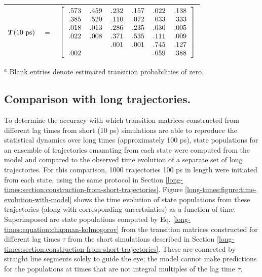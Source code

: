 \begin{table}[tbh]
\begin{center}
\begin{tabular}{lcc}
${\mbox{\boldmath{$T$}}}(10~\mathrm{ps})$ & $=$ & 
$\left[
\begin{tabular}{cccccc}
.573 & .459 & .232 & .157 & .022 & .138 \\
.385 & .520 & .110 & .072 & .033 & .333 \\
.018 & .013 & .286 & .235 & .030 & .005 \\
.022 & .008 & .371 & .535 & .111 & .009 \\
     &      & .001 & .001 & .745 & .127 \\
.002 &      &      &      & .059 & .388 \\
 \end{tabular}
 \right]$ \\
 \hline
 \end{tabular}
\end{center}
\footnotesize
$^a$ Blank entries denote estimated transition probabilities of zero.
\end{table}

\subsection{Comparison with long trajectories.}

To determine the accuracy with which transition matrices constructed from different lag times from short (10 ps) simulations are able to reproduce the statistical dynamics over long times (approximately 100 ps), state populations for an ensemble of trajectories emanating from each state were computed from the model and compared to the observed time evolution of a separate set of long trajectories.
For this comparison, 1000 trajectories 100 ps in length were initiated from each state, using the same protocol in Section \ref{long-times:section:construction-from-short-trajectories}.
Figure \ref{long-times:figure:time-evolution-with-model} shows the time evolution of state populations from these trajectories (along with corresponding uncertainties) as a function of time. 
Superimposed are state populations computed by Eq. \ref{long-times:equation:chapman-kolmogorov} from the transition matrices constructed for different lag times $\tau$ from the short simulations described in Section \ref{long-times:section:construction-from-short-trajectories}.
These are connected by straight line segments solely to guide the eye; the model cannot make predictions for the populations at times that are not integral multiples of the lag time $\tau$.

